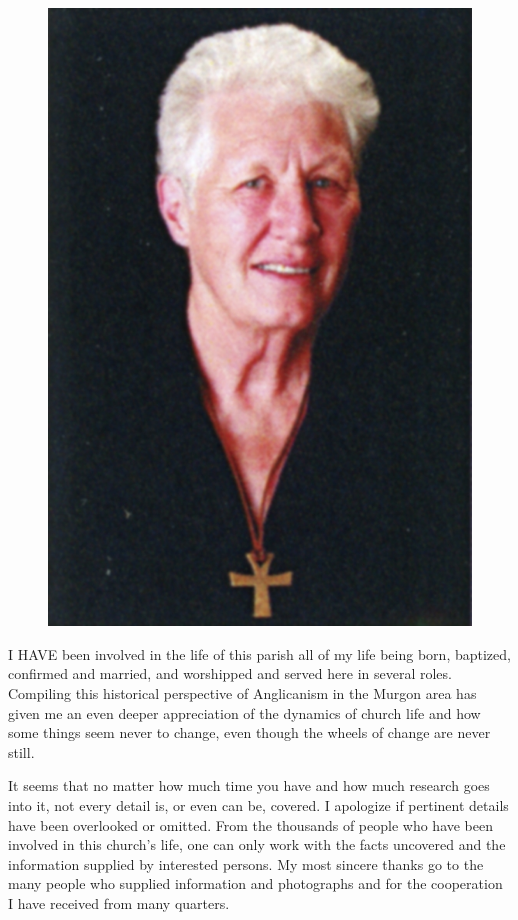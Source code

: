 \begin{figure}
\begin{center}
\includegraphics[width=.8\linewidth,center]{../images/theAuthor.jpg}
\caption{\itshape  }
\end{center}
\end{figure}




\lettrine[lines=3]{I}{ HAVE}
 been involved in the life of this parish all of my life being born, baptized, confirmed and married, and worshipped and served here in several roles. Compiling this historical perspective of Anglicanism in the Murgon area has given me an even deeper appreciation of the dynamics of church life and how some things seem never to change, even though the wheels of change are never still.

It seems that no matter how much time you have and how much research goes into it, not every detail is, or even can be, covered. I apologize if pertinent details have been overlooked or omitted. From the thousands of people who have been involved in this church's life, one can only work with the facts uncovered and the information supplied by interested persons. My most sincere thanks go to the many people who supplied information and photographs and for the cooperation I have received from many quarters.



